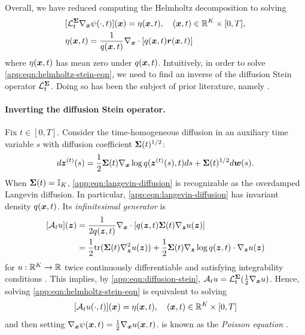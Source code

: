 Overall, we have reduced computing the Helmholtz decomposition to solving
\begin{equation}\label{app:eqn:helmholtz-stein-eqn}
\begin{aligned}
    &[\mathcal{L}_t^{\boldsymbol{\Sigma}}\nabla_{\boldsymbol{x}} \psi(\cdot, t)](\boldsymbol{x})
    =
    \eta(\boldsymbol{x}, t),
    \quad
    (\boldsymbol{x}, t) \in \mathbb{R}^K \times [0, T],\\
    &\eta(\boldsymbol{x}, t)
    =
    \frac{1}{q(\boldsymbol{x}, t)}
    \nabla_{\boldsymbol{x}} \cdot [q(\boldsymbol{x}, t) \boldsymbol{r}(\boldsymbol{x}, t)]
\end{aligned}
\end{equation}
where $\eta(\boldsymbol{x}, t)$ has mean zero under $q(\boldsymbol{x},t)$.
Intuitively, in order to solve \cref{app:eqn:helmholtz-stein-eqn}, we need to find an inverse of the diffusion Stein operator $\mathcal{L}_t^{\boldsymbol{\Sigma}}$. 
Doing so has been the subject of prior literature, namely \citet{barbour1990stein,pardoux2005poisson,gorham2019measuring}.

\paragraph{Inverting the diffusion Stein operator.}

Fix $t \in [0,T]$. Consider the time-homogeneous diffusion in an auxiliary time variable $s$ with diffusion coefficient $\boldsymbol{\Sigma}(t)^{1/2}$:
\begin{equation}\label{app:eqn:langevin-diffusion}
    d\boldsymbol{z}^{(t)}(s)
    =
    \frac{1}{2} \boldsymbol{\Sigma}(t)\nabla_{\boldsymbol{x}}\log q(\boldsymbol{z}^{(t)}(s), t)ds
    +
    \boldsymbol{\Sigma}(t)^{1/2}d\boldsymbol{w}(s). 
\end{equation}
When $\boldsymbol{\Sigma}(t) = \mathbb{I}_K$, \cref{app:eqn:langevin-diffusion} is recognizable as the overdamped Langevin diffusion.
In particular, \cref{app:eqn:langevin-diffusion} has invariant density $q(\boldsymbol{x}, t)$.
Its \emph{infinitesimal generator} is
\begin{equation}
\begin{aligned}
    [\cA_t u](\mbz)
    &=
    \frac{1}{2q(\mbz, t)}
    \nabla_{\mbx}\cdot
    \left[
        q(\mbz, t)\mbSigma(t)\nabla_{\mbz}u(\mbz)
    \right]\\
    &= \frac{1}{2} \mathrm{tr}(\mbSigma(t)\nabla_{\mbz}^2 u(\mbz)) + \frac{1}{2} \mbSigma(t) \nabla_{\mbz}\log q(\mbz, t) \cdot \nabla_{\mbz} u(\mbz)
\end{aligned}
\end{equation}
for $u: \mathbb{R}^K \to \mathbb{R}$ twice continuously differentiable and satisfying integrability conditions \cite{karatzas2014brownian}.
This implies, by \cref{app:eqn:diffusion-stein}, $\mathcal{A}_t u = \mathcal{L}_t^{\boldsymbol{\Sigma}}(\frac{1}{2}\nabla_{\boldsymbol{x}}u)$. 
Hence, solving \cref{app:eqn:helmholtz-stein-eqn} is equivalent to solving
\begin{equation}\label{app:eqn:poisson}
    [\mathcal{A}_t u(\cdot, t)](\boldsymbol{x}) = \eta(\boldsymbol{x}, t), \quad  (\boldsymbol{x}, t) \in \mathbb{R}^K \times [0, T]
\end{equation}
and then setting $\nabla_{\boldsymbol{x}}\psi(\boldsymbol{x},t) = \frac{1}{2} \nabla_{\boldsymbol{x}}u(\boldsymbol{x}, t)$.
 is known as the \emph{Poisson equation} \cite{pardoux2005poisson,gilbarg1998elliptic}.

